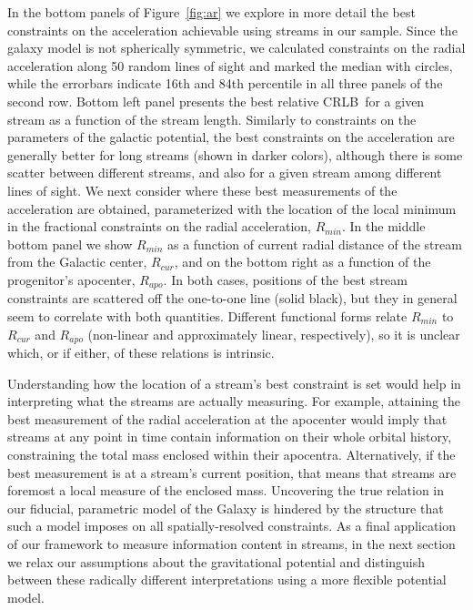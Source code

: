 \documentclass[modern]{aastex62}
\newcommand{\acronym}[1]{{\small{#1}}}
\newcommand{\CRLB}{\acronym{CRLB}}
\begin{document}
In the bottom panels of Figure~\ref{fig:ar} we explore in more detail the best constraints on the acceleration achievable using streams in our sample.
Since the galaxy model is not spherically symmetric, we calculated constraints on the radial acceleration along 50 random lines of sight and marked the median with circles, while the errorbars indicate 16th and 84th percentile in all three panels of the second row.
Bottom left panel presents the best relative \CRLB\ for a given stream as a function of the stream length.
Similarly to constraints on the parameters of the galactic potential, the best constraints on the acceleration are generally better for long streams (shown in darker colors), although there is some scatter between different streams, and also for a given stream among different lines of sight.
We next consider where these best measurements of the acceleration are obtained, parameterized with the location of the local minimum in the fractional constraints on the radial acceleration, $R_{min}$.
In the middle bottom panel we show $R_{min}$ as a function of current radial distance of the stream from the Galactic center, $R_{cur}$, and on the bottom right as a function of the progenitor's apocenter, $R_{apo}$.
In both cases, positions of the best stream constraints are scattered off the one-to-one line (solid black), but they in general seem to correlate with both quantities.
Different functional forms relate $R_{min}$ to $R_{cur}$ and $R_{apo}$ (non-linear and approximately linear, respectively), so it is unclear which, or if either, of these relations is intrinsic.

Understanding how the location of a stream's best constraint is set would help in interpreting what the streams are actually measuring.
For example, attaining the best measurement of the radial acceleration at the apocenter would imply that streams at any point in time contain information on their whole orbital history, constraining the total mass enclosed within their apocentra.
Alternatively, if the best measurement is at a stream's current position, that means that streams are foremost a local measure of the enclosed mass.
Uncovering the true relation in our fiducial, parametric model of the Galaxy is hindered by the structure that such a model imposes on all spatially-resolved constraints.
As a final application of our framework to measure information content in streams, in the next section we relax our assumptions about the gravitational potential and distinguish between these radically different interpretations using a more flexible potential model.
\end{document}
